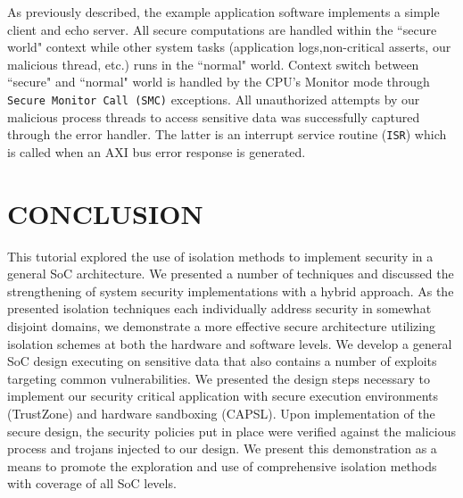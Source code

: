 \documentclass[sigconf]{acmart}
\theoremstyle{plain}
\theoremstyle{remark}
\begin{document}
As previously described, the example application software implements a simple client and echo server. All secure computations are handled within the ``secure world" context while other system tasks (application logs,non-critical asserts, our malicious thread, etc.) runs in the ``normal" world.   Context switch between ``secure" and ``normal" world is handled by the CPU's Monitor mode through \texttt{Secure Monitor Call (SMC)} exceptions. All unauthorized attempts by our malicious process threads to access sensitive data was successfully captured through the error handler. The latter is an interrupt service routine (\texttt{ISR}) which is called when an AXI bus error response is generated.


\section{CONCLUSION} \label{sec:conclusion}
This tutorial explored the use of isolation methods to implement security in a general SoC architecture. We presented a number of techniques and discussed the strengthening of system security implementations with a hybrid approach. As the presented isolation techniques each individually address security in somewhat disjoint domains, we demonstrate a more effective secure architecture utilizing isolation schemes at both the hardware and software levels. We develop a general SoC design executing on sensitive data that also contains a number of exploits targeting common vulnerabilities. We presented the design steps necessary to implement our security critical application with secure execution environments (TrustZone) and hardware sandboxing (CAPSL). Upon implementation of the secure design, the security policies put in place were verified against the malicious process and trojans injected to our design. We present this demonstration as a means to promote the exploration and use of comprehensive isolation methods with coverage of all SoC levels.




\end{document}
